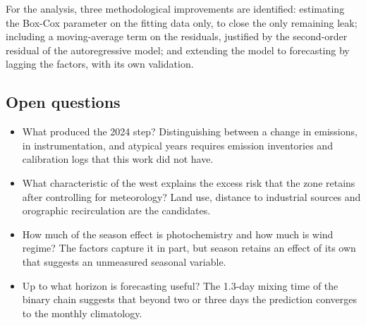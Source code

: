 For the analysis, three methodological improvements are identified:
estimating the Box-Cox parameter on the fitting data only, to close the only
remaining leak; including a moving-average term on the residuals, justified by
the second-order residual of the autoregressive model; and extending the
model to forecasting by lagging the factors, with its own validation.

\subsection{Open questions}

\begin{itemize}
  \item What produced the 2024 step? Distinguishing between a change in
    emissions, in instrumentation, and atypical years requires emission
    inventories and calibration logs that this work did not have.
  \item What characteristic of the west explains the excess risk that the
    zone retains after controlling for meteorology? Land use, distance to
    industrial sources and orographic recirculation are the candidates.
  \item How much of the season effect is photochemistry and how much is
    wind regime? The factors capture it in part, but season retains an
    effect of its own that suggests an unmeasured seasonal variable.
  \item Up to what horizon is forecasting useful? The 1.3-day mixing time of
    the binary chain suggests that beyond two or three days the prediction
    converges to the monthly climatology.
\end{itemize}
